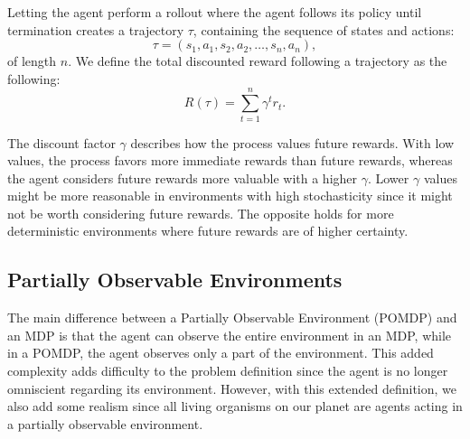 \documentclass[12pt,A4]{report}
\theoremstyle{definition}
\begin{document}

Letting the agent perform a rollout where the agent follows its policy until termination creates a trajectory $\tau$, containing the sequence of states and actions:
\[ \tau = (s_1, a_1, s_2, a_2, \dots , s_n, a_n),\]
of length $n$. We define the total discounted reward following a trajectory as the following:
\[ R(\tau) = \sum_{t=1}^n \gamma^t r_t.\]

The discount factor $\gamma$ describes how the process values future rewards. With low values, the process favors more immediate rewards than future rewards, whereas the agent considers future rewards more valuable with a higher $\gamma$. Lower $\gamma$ values might be more reasonable in environments with high stochasticity since it might not be worth considering future rewards. The opposite holds for more deterministic environments where future rewards are of higher certainty.


\subsection{Partially Observable Environments}

The main difference between a Partially Observable Environment (POMDP) and an MDP is that the agent can observe the entire environment in an MDP, while in a POMDP, the agent observes only a part of the environment. This added complexity adds difficulty to the problem definition since the agent is no longer omniscient regarding its environment. However, with this extended definition, we also add some realism since all living organisms on our planet are agents acting in a partially observable environment.
\end{document}
